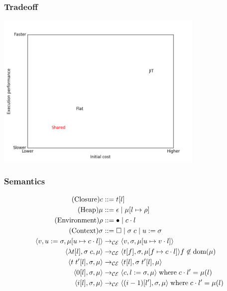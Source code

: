 \documentclass[17pt]{beamer}
\begin{document}
\begin{frame}[fragile]
\frametitle{Tradeoff}
\begin{center}
\includegraphics[width=10cm]{tradeoffplot}
\end{center}
\end{frame}

\begin{frame}[fragile]
\frametitle{Semantics}
\footnotesize
\begin{align*}
\tag{Closure} c &::= t [l] \\
\tag{Heap} \mu &::= \epsilon \; | \; \mu [ l \mapsto \rho ] \\
\tag{Environment} \rho &::= \bullet \; | \; c \cdot l \\
\tag{Context} \sigma &::= \square \; | \; \sigma \; c \;  | \; u:=\sigma \\
\langle v, u := \sigma, \mu[u \mapsto c \cdot l] \rangle 
  &\rightarrow_{\mathcal{CE}}
\langle v, \sigma, \mu[u \mapsto v \cdot l] \rangle  \\
\langle \lambda t[l], \sigma \; c, \mu \rangle 
  &\rightarrow_{\mathcal{CE}}
\langle t[f], \sigma, \mu[f \mapsto c \cdot l]\rangle f \not \in \textnormal{dom}(\mu)  \\
\langle t \; t'[l], \sigma, \mu \rangle
  &\rightarrow_{\mathcal{CE}}
\langle t[l], \sigma \; t'[l], \mu \rangle \\
\langle 0[l], \sigma, \mu \rangle
  &\rightarrow_{\mathcal{CE}}
\langle c, l := \sigma, \mu \rangle 
\; \textnormal{where} \; c \cdot l' = \mu(l)\\
\langle i[l], \sigma, \mu \rangle
  &\rightarrow_{\mathcal{CE}}
\langle (i-1)[l'], \sigma, \mu \rangle
\; \textnormal{where} \; c \cdot l' = \mu(l)
\end{align*}
\end{frame}
\end{document}
